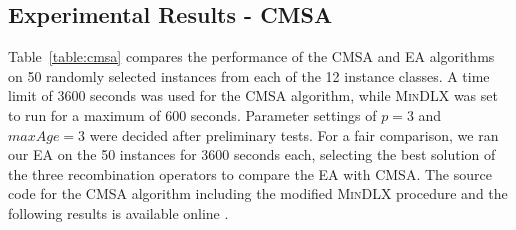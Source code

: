 \documentclass[authoryear]{elsarticle}
\begin{document}
\subsection{Experimental Results - CMSA}
\label{sub:expcmsa}
\noindent Table~\ref{table:cmsa} compares the performance of the CMSA and EA algorithms on 50 randomly selected instances from each of the 12 instance classes. A time limit of 3600 seconds was used for the CMSA algorithm, while \textsc{MinDLX} was set to run for a maximum of 600 seconds. Parameter settings of $p = 3$ and $maxAge = 3$ were decided after preliminary tests. For a fair comparison, we ran our EA on the 50 instances for 3600 seconds each, selecting the best solution of the three recombination operators to compare the EA with CMSA. The source code for the CMSA algorithm including the modified \textsc{MinDLX} procedure and the following results is available online \citep{hawa2019cmsa}.
\end{document}
